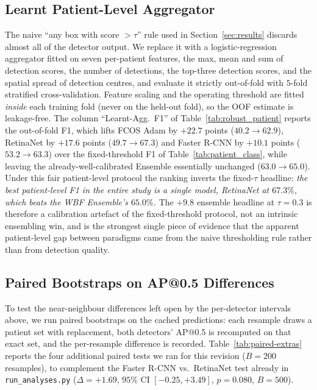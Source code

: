 \documentclass[11pt,a4paper]{article}
\begin{document}
\subsection{Learnt Patient-Level Aggregator}
The naive ``any box with score $> \tau$'' rule used in Section~\ref{sec:results} discards almost all of the detector output. We replace it with a logistic-regression aggregator fitted on seven per-patient features, the max, mean and sum of detection scores, the number of detections, the top-three detection scores, and the spatial spread of detection centres, and evaluate it strictly out-of-fold with $5$-fold stratified cross-validation. Feature scaling and the operating threshold are fitted \emph{inside} each training fold (never on the held-out fold), so the OOF estimate is leakage-free. The column ``Learnt-Agg.\ F1'' of Table~\ref{tab:robust_patient} reports the out-of-fold F1, which lifts FCOS Adam by $+22.7$ points ($40.2 \to 62.9$), RetinaNet by $+17.6$ points ($49.7 \to 67.3$) and Faster R-CNN by $+10.1$ points ($53.2 \to 63.3$) over the fixed-threshold F1 of Table~\ref{tab:patient_class}, while leaving the already-well-calibrated Ensemble essentially unchanged ($63.0 \to 65.0$). Under this fair patient-level protocol the ranking inverts the fixed-$\tau$ headline: \emph{the best patient-level F1 in the entire study is a single model, RetinaNet at $67.3\%$, which beats the WBF Ensemble's $65.0\%$.} The $+9.8$ ensemble headline at $\tau = 0.3$ is therefore a calibration artefact of the fixed-threshold protocol, not an intrinsic ensembling win, and is the strongest single piece of evidence that the apparent patient-level gap between paradigms came from the naive thresholding rule rather than from detection quality.

\pagebreak

\subsection{Paired Bootstraps on AP@0.5 Differences}
\label{sec:paired-bootstrap}
To test the near-neighbour differences left open by the per-detector intervals above, we run paired bootstraps on the cached predictions: each resample draws a patient set with replacement, both detectors' AP@0.5 is recomputed on that exact set, and the per-resample difference is recorded. Table~\ref{tab:paired-extras} reports the four additional paired tests we ran for this revision ($B = 200$ resamples), to complement the Faster R-CNN vs.\ RetinaNet test already in \texttt{run\_analyses.py} ($\Delta = +1.69$, $95\%$ CI $[-0.25, +3.49]$, $p = 0.080$, $B = 500$).
\end{document}
